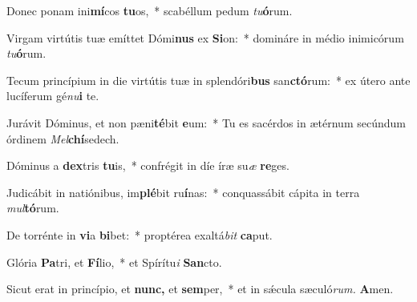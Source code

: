 \item Donec ponam ini\textbf{mí}cos \textbf{tu}os,~* scabéllum pedum \textit{tu}\textbf{ó}rum.
\item Virgam virtútis tuæ emíttet Dómi\textbf{nus} ex \textbf{Si}on:~* domináre in médio inimicórum \textit{tu}\textbf{ó}rum.
\item Tecum princípium in die virtútis tuæ in splendóri\textbf{bus} san\textbf{ctó}rum:~* ex útero ante lucíferum gé\textit{nu}\textbf{i} te.
\item Jurávit Dóminus, et non pæni\textbf{té}bit \textbf{e}um:~* Tu es sacérdos in ætérnum secúndum órdinem \textit{Mel}\textbf{chí}sedech.
\item Dóminus a \textbf{dex}tris \textbf{tu}is,~* confrégit in díe íræ su\tinyhspace\textit{æ} \textbf{re}ges.
\item Judicábit in natiónibus, im\textbf{plé}bit ru\textbf{í}nas:~* conquassábit cápita in terra \textit{mul}\hspace*{-0.03em}\textbf{tó}rum.
\item De torrénte in \textbf{vi}a \textbf{bi}bet:~* proptérea exaltá\textit{bit} \textbf{ca}put.
\item Glória \textbf{Pa}tri, et \textbf{Fí}lio,~* et Spírítu\textit{i} \textbf{San}cto.
\item Sicut erat in princípio, et \textbf{nunc,} et \textbf{sem}per,~* et in sǽcula sæculó\textit{rum.} \textbf{A}men.